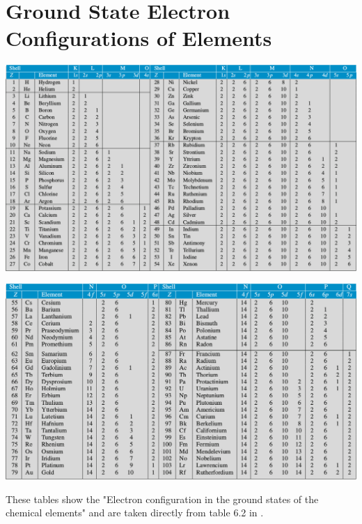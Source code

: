 \documentclass[openany,twoside, notitlepage,letterpaper,11pt]{book}
\begin{document}
\section{Ground State Electron Configurations of Elements}
\begin{center}
\includegraphics[scale=0.6]{./Images/Tables/electron_configuration.png}

\includegraphics[scale=0.6]{./Images/Tables/electron_configuration_2.png}

These tables show the "Electron configuration in the ground states of the chemical elements" and are taken directly from table 6.2 in \cite{Demtroder}.
\end{center}











\backmatter

\printindex
\end{document}
